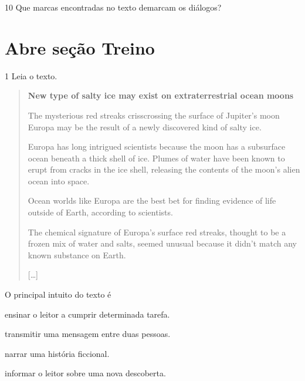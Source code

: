 

\num{10} Que marcas encontradas no texto demarcam os diálogos?



\section{Abre seção Treino}

\num{1} Leia o texto.

\begin{quote}
\textbf{New type of salty ice may exist on extraterrestrial ocean moons}

The mysterious red streaks crisscrossing the surface of Jupiter's moon
Europa may be the result of a newly discovered kind of salty ice.

Europa has long intrigued scientists because the moon has a subsurface
ocean beneath a thick shell of ice. Plumes of water have been known to
erupt from cracks in the ice shell, releasing the contents of the moon's
alien ocean into space.

Ocean worlds like Europa are the best bet for finding evidence of life
outside of Earth, according to scientists.

The chemical signature of Europa's surface red streaks, thought to be a
frozen mix of water and salts, seemed unusual because it didn't match
any known substance on Earth.

{[}\ldots{}{]}

\end{quote}


O principal intuito do texto é

\begin{escolha}
\item ensinar o leitor a cumprir determinada tarefa.

\item transmitir uma mensagem entre duas pessoas.

\item narrar uma história ficcional.

\item informar o leitor sobre uma nova descoberta.
\end{escolha}


